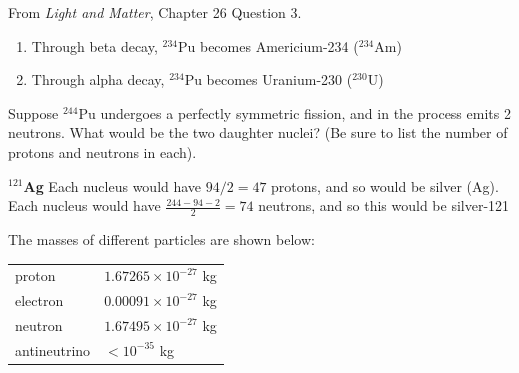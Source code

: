 \documentclass[12pt]{exam}
\begin{document}
\begin{questions}
From \textit{Light and Matter}, Chapter 26 Question 3.
\begin{TheSolution}
\begin{enumerate}
	\item Through beta decay, $^{234}$Pu becomes Americium-234 ($^{234}$Am)
	\item Through alpha decay,  $^{234}$Pu becomes Uranium-230 ($^{230}$U)
\end{enumerate}
\end{TheSolution}

\question Suppose $^{244}$Pu undergoes a perfectly symmetric fission, and in the process emits 2 neutrons. What would be the two daughter nuclei? (Be sure to list the number of protons and neutrons in each).
\begin{TheSolution}
	\textbf{$^{121}$Ag} Each nucleus would have $94/2 = 47$ protons, and so would be silver (Ag). Each nucleus would have $\frac{244 - 94 - 2}{2} = 74$ neutrons, and so this would be silver-121
\end{TheSolution}

\question The masses of different particles are shown below:

\begin{tabular}{l l }
	proton & $1.67265 \times 10^{-27}$ kg \\
	electron & $0.00091 \times 10^{-27}$ kg \\
	neutron & $1.67495 \times 10^{-27}$ kg\\
	antineutrino & $< 10^{-35}$ kg
\end{tabular}



\end{questions}
\end{document}
